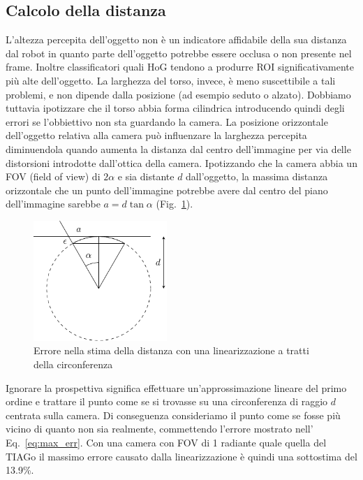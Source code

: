 \documentclass[a4paper]{article}
\begin{document}
	\subsection{Calcolo della distanza}\label{subsec:Calcolo-della-distanza}
	L'altezza percepita dell'oggetto non è un indicatore affidabile della sua
	distanza dal robot in quanto parte dell'oggetto potrebbe essere occlusa o
	non presente nel frame. Inoltre classificatori quali HoG tendono a produrre
	ROI significativamente più alte dell'oggetto. La larghezza del torso,
	invece, è meno suscettibile a tali problemi, e non dipende dalla posizione
	(ad esempio seduto o alzato). Dobbiamo tuttavia ipotizzare che il torso
	abbia forma cilindrica introducendo quindi degli errori se l'obbiettivo non
	sta guardando la camera.	La posizione orizzontale dell'oggetto relativa
	alla camera può influenzare la larghezza percepita diminuendola quando
	aumenta la distanza dal centro dell'immagine per via delle distorsioni
	introdotte dall'ottica della camera. Ipotizzando che la camera abbia un FOV
	(field of view) di $2\alpha$ e sia distante $d$ dall'oggetto, la massima
	distanza orizzontale che un punto dell'immagine potrebbe avere dal centro
	del piano dell'immagine sarebbe $a = d \tan \alpha$ (Fig.~\ref{fig:error}).
	
	\begin{figure}[H]
		\centering
		\includegraphics[width=0.45\textwidth]{./img/linearization_error.pdf}
		\caption{Errore nella stima della distanza con una linearizzazione a tratti della circonferenza}
		\label{fig:error}
	\end{figure}

	Ignorare la prospettiva significa effettuare un'approssimazione lineare del
	primo ordine e trattare il punto come se si trovasse su una circonferenza
	di raggio $d$ centrata sulla camera. Di conseguenza consideriamo il punto
	come se fosse più vicino di quanto non sia realmente, commettendo l'errore
	mostrato nell' Eq.~\ref{eq:max_err}. Con una camera con FOV di 1 radiante
	quale quella del TIAGo il massimo errore causato dalla linearizzazione è
	quindi una sottostima del 13.9\%.
	
\end{document}
